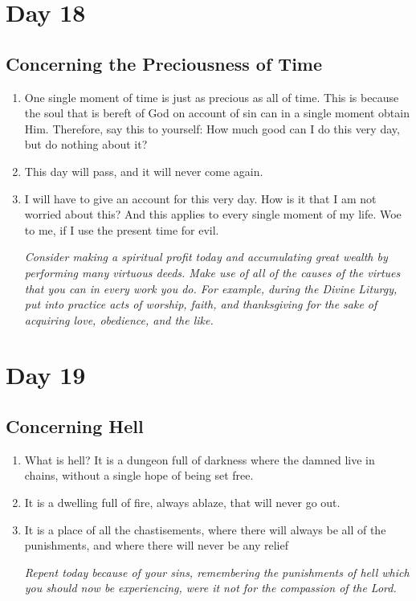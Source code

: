 \documentclass[11pt]{article}
\begin{document}
\section*{Day 18}
\label{sec:org6524c33}
\subsection*{Concerning the Preciousness of Time}
\label{sec:orgeee5c3f}
\begin{enumerate}
\item One single moment of time is just as precious as all of time. This is because the soul that is bereft of God on account of sin can in a single moment
obtain Him. Therefore, say this to yourself: How much good can I do this very day, but do nothing about it?
\item This day will pass, and it will never come again.
\item I will have to give an account for this very day. How is it that I am not worried about this? And this applies to every single moment of my life.
Woe to me, if I use the present time for evil.

\emph{Consider making a spiritual profit today and accumulating great wealth by performing many virtuous deeds. Make use of all of the causes of the virtues}
\emph{that you can in every work you do. For example, during the Divine Liturgy, put into practice acts of worship, faith, and thanksgiving for the sake of}
\emph{acquiring love, obedience, and the like.}
\end{enumerate}
\section*{Day 19}
\label{sec:orgd868712}
\subsection*{Concerning Hell}
\label{sec:org2b1e26b}
\begin{enumerate}
\item What is hell? It is a dungeon full of darkness where the damned live in chains, without a single hope of being set free.
\item It is a dwelling full of fire, always ablaze, that will never go out.
\item It is a place of all the chastisements, where there will always be all of the punishments, and where there will never be any relief

\emph{Repent today because of your sins, remembering the punishments of hell which you should now be experiencing, were it not for the compassion of the Lord.}
\end{enumerate}
\end{document}
